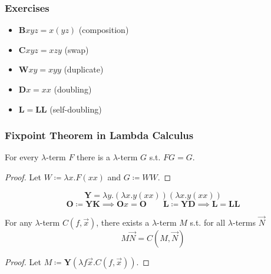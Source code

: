 \documentclass[UTF8,11pt,colorlinks,compress,openany]{beamer}%
\begin{document}
\begin{frame}\frametitle{Exercises}
\begin{itemize}
	\item $\mathbf{B}xyz=x(yz)$ (composition)
	\item $\mathbf{C}xyz=xzy$ (swap)
	\item $\mathbf{W}xy=xyy$ (duplicate)
	\item $\mathbf{D}x=xx$ (doubling)
	\item $\mathbf{L}=\mathbf{L}\mathbf{L}$ (self-doubling)
\end{itemize}
\end{frame}

\begin{frame}\frametitle{Fixpoint Theorem in Lambda Calculus}
\setlength\abovedisplayskip{0pt}
\setlength\belowdisplayskip{0pt}
\begin{theorem}
	For every $\lambda$-term $F$ there is a $\lambda$-term $G$ s.t. $FG=G$.
\end{theorem}
\begin{proof}
Let $W\coloneqq \lambda x.F(xx)$ and $G\coloneqq WW$.
\end{proof}
\[\mathbf{Y}=\lambda y.(\lambda x.y(xx))(\lambda x.y(xx))\]
\[\mathbf{O}\coloneqq \mathbf{Y}\mathbf{K}\implies \mathbf{O}x=\mathbf{O}\qquad \mathbf{L}\coloneqq \mathbf{Y}\mathbf{D}\implies \mathbf{L}=\mathbf{L}\mathbf{L}\]
\begin{corollary}
For any $\lambda$-term $C(f,\vec{x})$, there exists a $\lambda$-term $M$ s.t. for all $\lambda$-terms $\vec{N}$
\[M\vec{N}=C(M,\vec{N})\]
\end{corollary}
\begin{proof}
Let $M\coloneqq \mathbf{Y}(\lambda f\vec{x}.C(f,\vec{x}))$.
\end{proof}
\end{frame}
\end{document}

